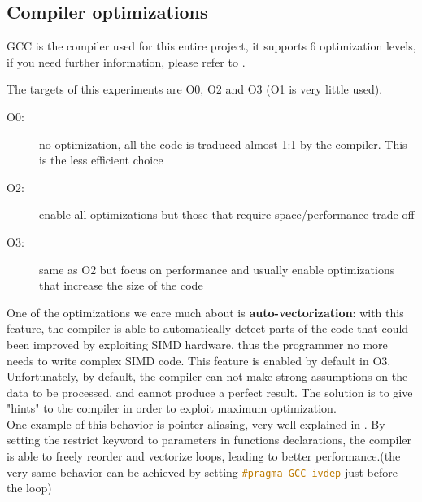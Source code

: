 \documentclass[a4paper]{article}
\begin{document}
\subsection{Compiler optimizations} \label{setup-comp}

GCC is the compiler used for this entire project, it supports 6 optimization levels, if you need further information, please refer to \autocite{GCCOPT}.

The targets of this experiments are O0, O2 and O3 (O1 is very little used).
\begin{description}
	\item[O0:] no optimization, all the code is traduced almost 1:1 by the compiler. This is the less efficient choice
	\item[O2:] enable all optimizations but those that require space/performance trade-off
	\item[O3:] same as O2 but focus on performance and usually enable optimizations that increase the size of the code
\end{description}
One of the optimizations we care much about is \textbf{auto-vectorization}: with this feature, the compiler is able to automatically detect parts of the code that could been improved by exploiting SIMD hardware, thus the programmer no more needs to write complex SIMD code. This feature is enabled by default in O3.
\\Unfortunately, by default, the compiler can not make strong assumptions on the data to be processed, and cannot produce a perfect result.
The solution is to give "hints" to the compiler in order to exploit maximum optimization.
\\One example of this behavior is pointer aliasing, very well explained in \autocite{ALIAS}.
By setting the restrict keyword to parameters in functions declarations, the compiler is able to freely reorder and vectorize loops, leading to better performance.(the very same behavior can be achieved by setting \lstinline[language=c, basicstyle=\ttfamily]{#pragma GCC ivdep} just before the loop)
\end{document}
